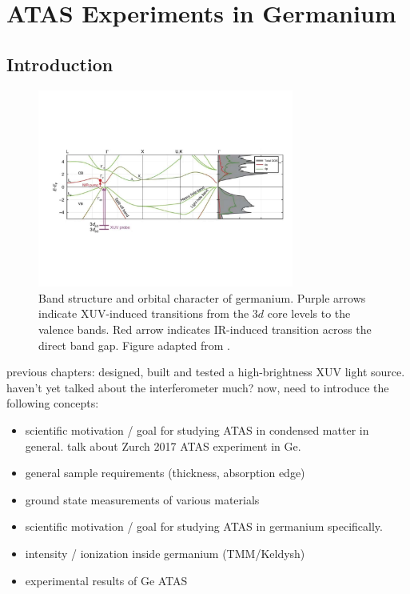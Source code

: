 \chapter{ATAS Experiments in Germanium}
\label{chap:ATAS_in_Ge}


\section{Introduction}







\begin{figure}
	\centering
	\includegraphics[width=0.75\textwidth]{figures/chap4/Ge_band_diagram_Zurch2017.pdf}
	\caption{Band structure and orbital character of germanium. Purple arrows indicate XUV-induced transitions from the $3d$ core levels to the valence bands. Red arrow indicates IR-induced transition across the direct band gap. Figure adapted from \cite{zurchDirectSimultaneousObservation2017}.}
	\label{fig:Ge_band_diagram}
\end{figure}

previous chapters: designed, built and tested a high-brightness XUV light source. haven't yet talked about the interferometer much? now, need to introduce the following concepts:
\begin{itemize}
	\item scientific motivation / goal for studying ATAS in condensed matter in general. talk about Zurch 2017 ATAS experiment in Ge.
	\item general sample requirements (thickness, absorption edge)
	\item ground state measurements of various materials
	\item scientific motivation / goal for studying ATAS in germanium specifically.
	\item intensity / ionization inside germanium (TMM/Keldysh)
	\item experimental results of Ge ATAS

\end{itemize}

